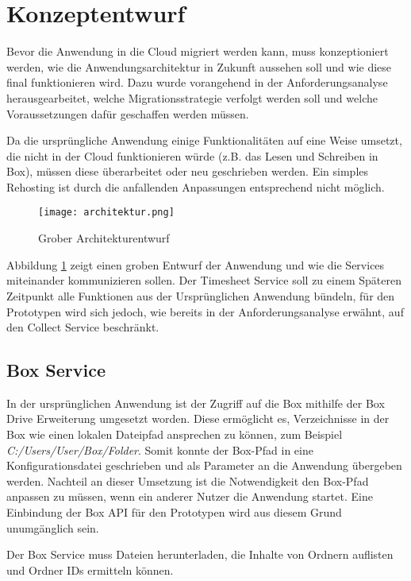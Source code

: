 \section{Konzeptentwurf}
Bevor die Anwendung in die Cloud migriert werden kann, muss konzeptioniert werden, wie die Anwendungsarchitektur in Zukunft aussehen soll und wie diese final funktionieren wird. Dazu wurde vorangehend in der Anforderungsanalyse herausgearbeitet, welche Migrationsstrategie verfolgt werden soll und welche Voraussetzungen dafür geschaffen werden müssen.

Da die ursprüngliche Anwendung einige Funktionalitäten auf eine Weise umsetzt, die nicht in der Cloud funktionieren würde (z.B. das Lesen und Schreiben in Box), müssen diese überarbeitet oder neu geschrieben werden. Ein simples Rehosting ist durch die anfallenden Anpassungen entsprechend nicht möglich.

\begin{figure}[H]
    \centering
    \texttt{[image: architektur.png]}
    \caption{Grober Architekturentwurf}
    \label{fig:Architektur}
\end{figure}

Abbildung \ref{fig:Architektur} zeigt einen groben  Entwurf der Anwendung und wie die Services miteinander kommunizieren sollen. Der Timesheet Service soll zu einem Späteren Zeitpunkt alle Funktionen aus der Ursprünglichen Anwendung bündeln, für den Prototypen wird sich jedoch, wie bereits in der Anforderungsanalyse erwähnt, auf den Collect Service beschränkt.
\pagebreak

\subsection{Box Service}
In der ursprünglichen Anwendung ist der Zugriff auf die Box mithilfe der Box Drive Erweiterung umgesetzt worden. Diese ermöglicht es, Verzeichnisse in der Box wie einen lokalen Dateipfad ansprechen zu können, zum Beispiel \textit{C:/Users/User/Box/Folder}. Somit konnte der Box-Pfad in eine Konfigurationsdatei geschrieben und als Parameter an die Anwendung übergeben werden. Nachteil an dieser Umsetzung ist die Notwendigkeit den Box-Pfad anpassen zu müssen, wenn ein anderer Nutzer die Anwendung startet. Eine Einbindung der Box \ac{API} für den Prototypen wird aus diesem Grund unumgänglich sein.

Der Box Service muss Dateien herunterladen, die Inhalte von Ordnern auflisten und Ordner IDs ermitteln können.

